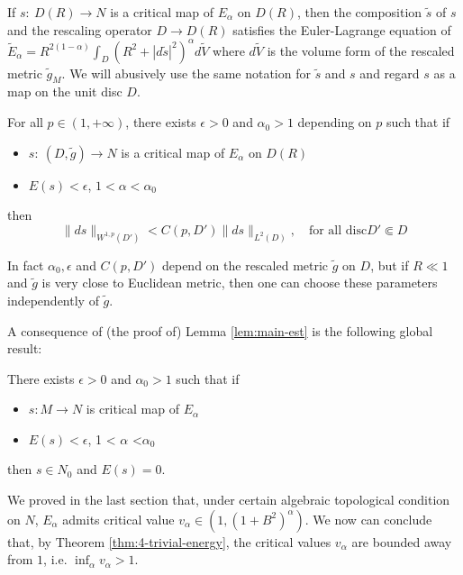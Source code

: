 If \(s:\ D(R) \longrightarrow N\) is a critical map
of \(E_\alpha\) on \(D(R)\), then the composition \(\tilde s\) of \(s\) and the rescaling operator \(D
\longrightarrow D(R)\) satisfies the Euler-Lagrange equation of \(\tilde E_\alpha =
R^{2(1-\alpha)}\int_D (R^2 + |d\tilde s|^2)^\alpha d\tilde V\) where \(d\tilde V\) is
the volume form of the rescaled metric \(\tilde g_M\). We will abusively
use the same notation for \(\tilde s\) and \(s\) and regard \(s\) as a map on the unit disc \(D\). 

\begin{lemma}
\label{lem:main-est}
For all \(p\in (1,+\infty)\), there exists \(\epsilon>0\) and \(\alpha_0 >1\)
depending on \(p\) such that if
\begin{itemize}
\item \(s:\ (D,\tilde g) \longrightarrow N\) is a critical map of \(E_\alpha\) on \(D(R)\)
\item \(E(s) < \epsilon\), \(1 < \alpha <\alpha_0\)
\end{itemize}
then
\[
 \|ds\|_{W^{1,p}(D')} < C(p,D') \|ds\|_{L^2(D)},\quad \text{for all disc}  D'\Subset D 
\]
\end{lemma}

\begin{remark}
In fact \(\alpha_0, \epsilon\) and \(C(p,D')\) depend on the rescaled metric \(\tilde
g\) on \(D\), but if \(R \ll 1\) and \(\tilde g\) is very close to Euclidean metric,
then one can choose these parameters independently of \(\tilde g\). 
\end{remark}

A consequence of (the proof of) Lemma \ref{lem:main-est} is the following global result:

\begin{theorem}
\label{thm:4-trivial-energy}
There exists \(\epsilon >0\) and \(\alpha_0 > 1\)  such that if
\begin{itemize}
\item \(s: M \longrightarrow N\) is critical map of \(E_\alpha\)
\item \(E(s)<\epsilon\), 1 < \(\alpha\) <\(\alpha_{\text{0}}\)
\end{itemize}
then \(s\in N_0\) and \(E(s) = 0\).
\end{theorem}

We proved in the last section that, under certain algebraic topological condition on \(N\), \(E_\alpha\) admits critical value \(v_\alpha \in (1, (1+B^2)^\alpha)\). We now
can conclude that, by Theorem \ref{thm:4-trivial-energy}, the critical values \(v_\alpha\)
are bounded away from \(1\), i.e. \(\inf_{\alpha} v_\alpha > 1\).


